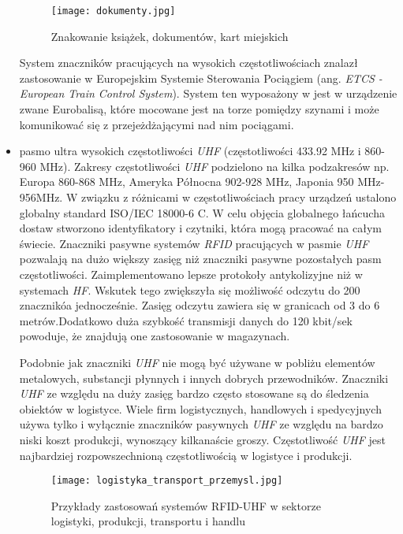 \begin{itemize}
	\begin{figure}[h!]
	\centering
	    \texttt{[image: dokumenty.jpg]}
	    \caption{Znakowanie książek, dokumentów, kart miejskich}
	\end{figure}
	
	 System znaczników pracujących na wysokich częstotliwościach znalazł zastosowanie w Europejskim Systemie Sterowania Pociągiem (ang. \emph{ETCS - European Train Control System}). System ten wyposażony w jest w urządzenie zwane Eurobalisą, które mocowane jest na torze pomiędzy szynami i może komunikować się z przejeżdżającymi nad nim pociągami.

	\item pasmo ultra wysokich częstotliwości \emph{UHF} (częstotliwości 433.92 MHz i 860-960 MHz).
Zakresy częstotliwości \emph{UHF} podzielono na kilka podzakresów np. Europa 860-868 MHz, Ameryka Północna 902-928 MHz, Japonia  950 MHz-956MHz. W związku z różnicami w częstotliwościach pracy urządzeń ustalono globalny standard ISO/IEC 18000-6 C. W celu objęcia globalnego łańcucha dostaw stworzono identyfikatory i czytniki, która mogą pracować na całym świecie. Znaczniki pasywne systemów \emph{RFID} pracujących w pasmie \emph{UHF} pozwalają na dużo większy zasięg niż znaczniki pasywne pozostałych pasm częstotliwości. Zaimplementowano lepsze protokoły antykolizyjne niż w systemach \emph{HF}. Wskutek tego zwiększyła się możliwość odczytu do 200 znacznikóa jednocześnie. Zasięg odczytu zawiera się w granicach od 3 do 6 metrów.Dodatkowo duża szybkość transmisji danych do 120 kbit/sek powoduje, że znajdują one zastosowanie w magazynach.

Podobnie jak znaczniki \emph{UHF} nie mogą być używane w pobliżu elementów metalowych, substancji płynnych i innych dobrych przewodników. 
Znaczniki \emph{UHF} ze względu na duży zasięg bardzo często stosowane są do śledzenia obiektów w logistyce. Wiele firm logistycznych, handlowych i spedycyjnych używa tylko i wyłącznie znaczników pasywnych \emph{UHF} ze względu na bardzo niski koszt produkcji, wynoszący kilkanaście groszy. 
Częstotliwość \emph{UHF} jest najbardziej rozpowszechnioną częstotliwością w logistyce i produkcji.

	\begin{figure}[h!]
	\centering
	    \texttt{[image: logistyka\_transport\_przemysl.jpg]}
	    \caption{Przykłady zastosowań systemów RFID-UHF w sektorze logistyki, produkcji, transportu i handlu}
	\end{figure}


\end{itemize}
